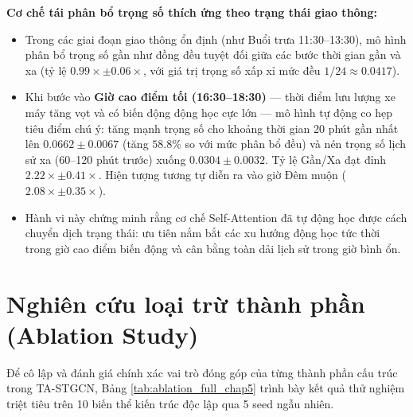 \textbf{Cơ chế tái phân bổ trọng số thích ứng theo trạng thái giao thông:}
\begin{itemize}
    \item Trong các giai đoạn giao thông ổn định (như Buổi trưa 11:30--13:30), mô hình phân bổ trọng số gần như đồng đều tuyệt đối giữa các bước thời gian gần và xa (tỷ lệ $0.99\times \pm 0.06\times$, với giá trị trọng số xấp xỉ mức đều $1/24 \approx 0.0417$).
    \item Khi bước vào \textbf{Giờ cao điểm tối (16:30--18:30)} --- thời điểm lưu lượng xe máy tăng vọt và có biến động động học cực lớn --- mô hình tự động co hẹp tiêu điểm chú ý: tăng mạnh trọng số cho khoảng thời gian 20 phút gần nhất lên $0.0662 \pm 0.0067$ (tăng $58.8\%$ so với mức phân bổ đều) và nén trọng số lịch sử xa (60--120 phút trước) xuống $0.0304 \pm 0.0032$. Tỷ lệ Gần/Xa đạt đỉnh \textbf{$2.22\times \pm 0.41\times$}. Hiện tượng tương tự diễn ra vào giờ Đêm muộn ($2.08\times \pm 0.35\times$).
    \item Hành vi này chứng minh rằng cơ chế Self-Attention đã tự động học được cách chuyển dịch trạng thái: ưu tiên nắm bắt các xu hướng động học tức thời trong giờ cao điểm biến động và cân bằng toàn dải lịch sử trong giờ bình ổn.
\end{itemize}

\section{Nghiên cứu loại trừ thành phần (Ablation Study)}
\label{sec:ablation_study}

Để cô lập và đánh giá chính xác vai trò đóng góp của từng thành phần cấu trúc trong TA-STGCN, Bảng \ref{tab:ablation_full_chap5} trình bày kết quả thử nghiệm triệt tiêu trên 10 biến thể kiến trúc độc lập qua 5 seed ngẫu nhiên.

